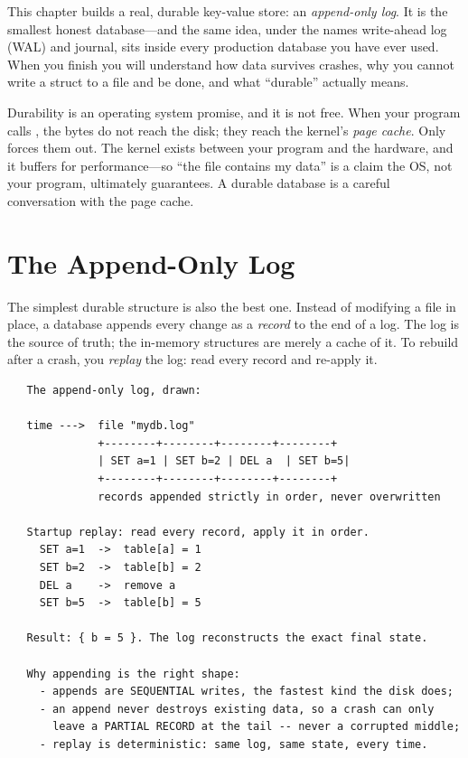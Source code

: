 This chapter builds a real, durable key-value store: an
\emph{append-only log}. It is the smallest honest database---and the
same idea, under the names write-ahead log (WAL) and journal, sits
inside every production database you have ever used. When you finish
you will understand how data survives crashes, why you cannot write a
struct to a file and be done, and what ``durable'' actually means.

\begin{osconcept}
Durability is an operating system promise, and it is not free. When
your program calls , the bytes do not reach the disk; they
reach the kernel's \emph{page cache}. Only  forces them
out. The kernel exists between your program and the hardware, and it
buffers for performance---so ``the file contains my data'' is a claim
the OS, not your program, ultimately guarantees. A durable database is
a careful conversation with the page cache.
\end{osconcept}

\section{The Append-Only Log}

The simplest durable structure is also the best one. Instead of
modifying a file in place, a database appends every change as a
\emph{record} to the end of a log. The log is the source of truth; the
in-memory structures are merely a cache of it. To rebuild after a
crash, you \emph{replay} the log: read every record and re-apply it.

\begin{verbatim}
   The append-only log, drawn:

   time --->  file "mydb.log"
              +--------+--------+--------+--------+
              | SET a=1 | SET b=2 | DEL a  | SET b=5|
              +--------+--------+--------+--------+
              records appended strictly in order, never overwritten

   Startup replay: read every record, apply it in order.
     SET a=1  ->  table[a] = 1
     SET b=2  ->  table[b] = 2
     DEL a    ->  remove a
     SET b=5  ->  table[b] = 5

   Result: { b = 5 }. The log reconstructs the exact final state.

   Why appending is the right shape:
     - appends are SEQUENTIAL writes, the fastest kind the disk does;
     - an append never destroys existing data, so a crash can only
       leave a PARTIAL RECORD at the tail -- never a corrupted middle;
     - replay is deterministic: same log, same state, every time.
\end{verbatim}

